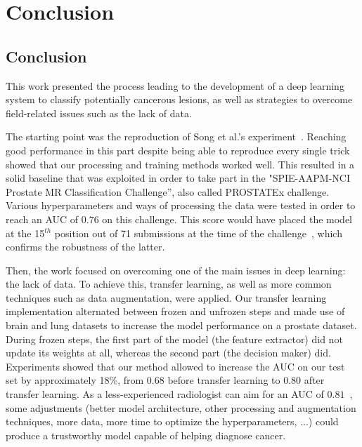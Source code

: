 
\chapter{Conclusion}
\label{ch:conclusions}

\section{Conclusion}
\setlength{\marginparwidth}{3cm}\leavevmode {}This work presented the process leading to the development of a deep learning system to classify potentially cancerous lesions, as well as strategies to overcome field-related issues such as the lack of data.

The starting point was the reproduction of Song et al.'s experiment~\cite{07}. Reaching good performance in this part despite being able to reproduce every single trick showed that our processing and training methods worked well. This resulted in a solid baseline that was exploited in order to take part in the "SPIE-AAPM-NCI Prostate MR Classification Challenge”, also called PROSTATEx challenge. Various hyperparameters and ways of processing the data were tested in order to reach an AUC of $0.76$ on this challenge. This score would have placed the model at the 15$^{th}$ position out of 71 submissions at the time of the challenge~\cite{42}, which confirms the robustness of the latter.

Then, the work focused on overcoming one of the main issues in deep learning: the lack of data. To achieve this, transfer learning, as well as more common techniques such as data augmentation, were applied. Our transfer learning implementation alternated between frozen and unfrozen steps and made use of brain and lung datasets to increase the model performance on a prostate dataset. During frozen steps, the first part of the model (the feature extractor) did not update its weights at all, whereas the second part (the decision maker) did. Experiments showed that our method allowed to increase the AUC on our test set by approximately 18\%, from $0.68$ before transfer learning to $0.80$ after transfer learning. As a less-experienced radiologist can aim for an AUC of $0.81$~\cite{42}, some adjustments (better model architecture, other processing and augmentation techniques, more data, more time to optimize the hyperparameters, ...) could produce a trustworthy model capable of helping diagnose cancer.

